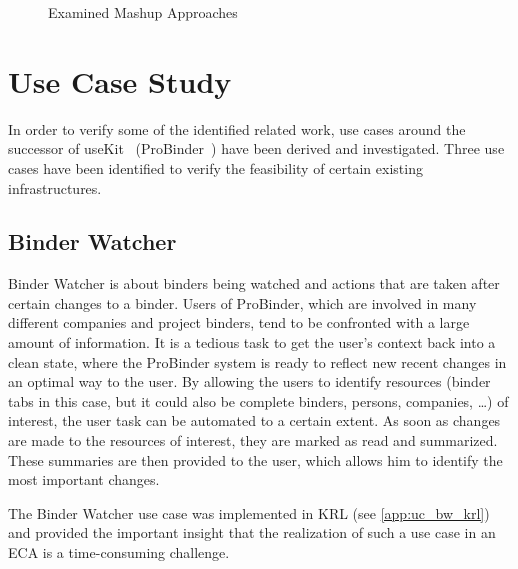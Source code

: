 \documentclass[11pt]{article}%
\begin{document}
\begin{figure}[htb]
\centering

\caption{Examined Mashup Approaches}
\end{figure}

\section{Use Case Study}
In order to verify some of the identified related work, use cases around the successor of useKit~\cite{2010-Rizzotti_Burkhart-useKit.pdf} (ProBinder~\cite{wwwprobinder}) have been derived and investigated. 
Three use cases have been identified to verify the feasibility of certain existing infrastructures.

\subsection{Binder Watcher}
Binder Watcher is about binders being watched and actions that are taken after certain changes to a binder. Users of ProBinder, which are involved in many different companies and project binders, tend to be confronted with a large amount of information. It is a tedious task to get the user's context back into a clean state, where the ProBinder system is ready to reflect new recent changes in an optimal way to the user. By allowing the users to identify resources (binder tabs in this case, but it could also be complete binders, persons, companies, \dots) of interest, the user task can be automated to a certain extent. As soon as changes are made to the resources of interest, they are marked as read and summarized. These summaries are then provided to the user, which allows him to identify the most important changes.

The Binder Watcher use case was implemented in KRL (see \ref{app:uc_bw_krl}) and provided the important insight that the realization of such a use case in an ECA is a time-consuming challenge. 
\end{document}

